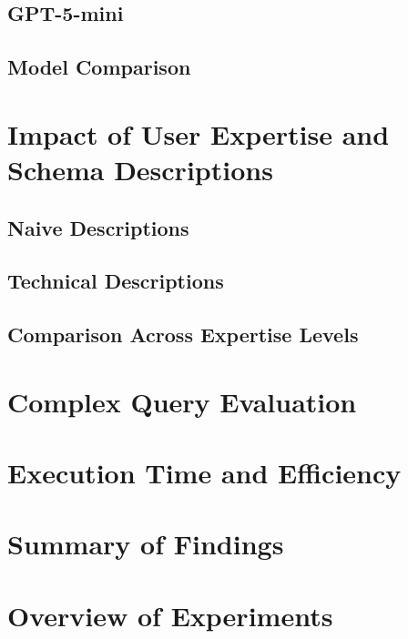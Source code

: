     \subsection{GPT-5-mini}
    \subsection{Model Comparison}

\section{Impact of User Expertise and Schema Descriptions}
    \subsection{Naive Descriptions}
    \subsection{Technical Descriptions}
    \subsection{Comparison Across Expertise Levels}

\section{Complex Query Evaluation}

\section{Execution Time and Efficiency}

\section{Summary of Findings}


















\section{Overview of Experiments}


